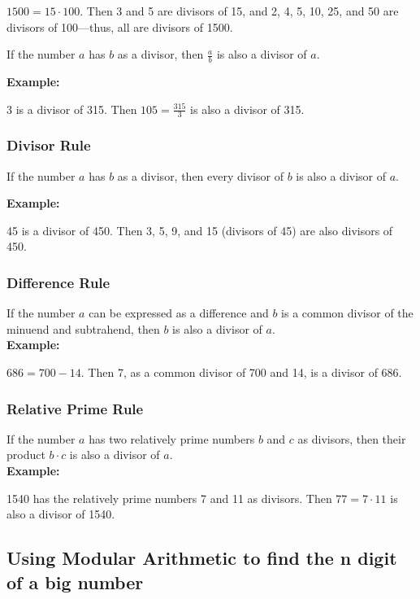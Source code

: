 \( 1500 = 15 \cdot 100 \). Then 3 and 5 are divisors of 15, and 2, 4, 5, 10, 25, and 50 are divisors of 
100—thus, all are divisors of 1500.


If the number \(a\) has \(b\) as a divisor, then \( \frac{a}{b} \) is also a divisor of \(a\).

\textbf{Example:}

3 is a divisor of 315. Then \( 105 = \frac{315}{3} \) is also a divisor of 315.

\subsubsection{Divisor Rule}

If the number \(a\) has \(b\) as a divisor, then every divisor of \(b\) is also a divisor of 
\(a\).

\textbf{Example:}

45 is a divisor of 450. Then 3, 5, 9, and 15 (divisors of 45) are also divisors of 450.

\subsubsection{Difference Rule}

If the number \(a\) can be expressed as a difference and \(b\) is a common divisor of the minuend 
and subtrahend, then \(b\) is also a divisor of \(a\). \\

\textbf{Example:}

\( 686 = 700 - 14 \). Then 7, as a common divisor of 700 and 14, is a divisor of 686.

\subsubsection{Relative Prime Rule}

If the number \(a\) has two relatively prime numbers \(b\) and \( c \) as divisors, then their 
product \( b \cdot c \) is also a divisor of \(a\). \\

\textbf{Example:}

1540 has the relatively prime numbers 7 and 11 as divisors. Then \( 77 = 7 \cdot 11 \) is also a divisor 
of 1540.

\subsection{Using Modular Arithmetic to find the n digit of a big number}

